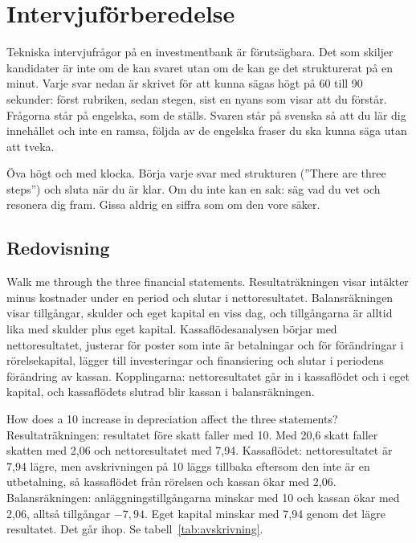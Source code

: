 \section{Intervjuförberedelse}
\label{sec:intervju}

Tekniska intervjufrågor på en investmentbank är förutsägbara. Det som skiljer kandidater är
inte om de kan svaret utan om de kan ge det strukturerat på en minut. Varje svar nedan är
skrivet för att kunna sägas högt på 60 till 90 sekunder: först rubriken, sedan stegen, sist en
nyans som visar att du förstår. Frågorna står på engelska, som de ställs. Svaren står på
svenska så att du lär dig innehållet och inte en ramsa, följda av de engelska fraser du ska
kunna säga utan att tveka.

\begin{intervjutips}
Öva högt och med klocka. Börja varje svar med strukturen (”There are three steps”) och sluta
när du är klar. Om du inte kan en sak: säg vad du vet och resonera dig fram. Gissa aldrig en
siffra som om den vore säker.
\end{intervjutips}

\subsection{Redovisning}

\begin{fraga}{Walk me through the three financial statements.}
Resultaträkningen visar intäkter minus kostnader under en period och slutar i nettoresultatet.
Balansräkningen visar tillgångar, skulder och eget kapital en viss dag, och tillgångarna är
alltid lika med skulder plus eget kapital. Kassaflödesanalysen börjar med nettoresultatet,
justerar för poster som inte är betalningar och för förändringar i rörelsekapital, lägger till
investeringar och finansiering och slutar i periodens förändring av kassan. Kopplingarna:
nettoresultatet går in i kassaflödet och i eget kapital, och kassaflödets slutrad blir kassan i
balansräkningen.
\end{fraga}

\begin{fraga}{How does a 10 increase in depreciation affect the three statements?}
Resultaträkningen: resultatet före skatt faller med 10. Med 20,6\pct{} skatt faller skatten med
2,06 och nettoresultatet med 7,94. Kassaflödet: nettoresultatet är 7,94 lägre, men
avskrivningen på 10 läggs tillbaka eftersom den inte är en utbetalning, så kassaflödet från
rörelsen och kassan ökar med 2,06. Balansräkningen: anläggningstillgångarna minskar med 10 och
kassan ökar med 2,06, alltså tillgångar $-7,94$. Eget kapital minskar med 7,94 genom det lägre
resultatet. Det går ihop. Se tabell~\ref{tab:avskrivning}.
\end{fraga}

